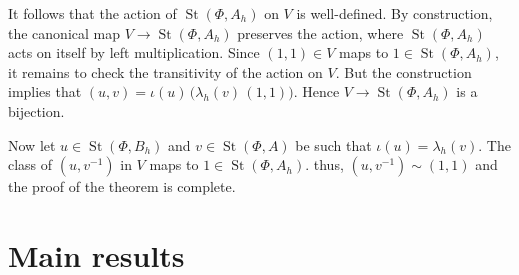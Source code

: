 \documentclass[oneside, 11pt]{amsart} \pdfoutput=1
\newcommand{\St}{\mathop{\mathrm{St}}\nolimits}
\numberwithin{equation}{section}
\theoremstyle{definition}
\begin{document}
It follows that the action of $\St(\Phi, A_h)$ on $V$ is well-defined. By construction, the canonical map \(V \to \St(\Phi, A_h)\) preserves the action, where \(\St(\Phi, A_h)\) acts on itself by left multiplication. Since \((1, 1) \in V\) maps to \(1 \in \St(\Phi, A_h)\), it remains to check the transitivity of the action on \(V\). But the construction implies that \((u, v) = \iota(u)\, \bigl(\lambda_h(v)\, (1, 1)\bigr)\). Hence \(V \to \St(\Phi, A_h)\) is a bijection.

Now let \(u \in \St(\Phi, B_h)\) and \(v \in \St(\Phi, A)\) be such that \(\iota(u) = \lambda_h(v)\). The class of \((u, v^{-1})\) in \(V\) maps to \(1 \in \St(\Phi, A_h)\). thus, \((u, v^{-1}) \sim (1, 1)\) and the proof of the theorem is complete.


\section{Main results}\label{sec:main}

\printbibliography
\end{document}
